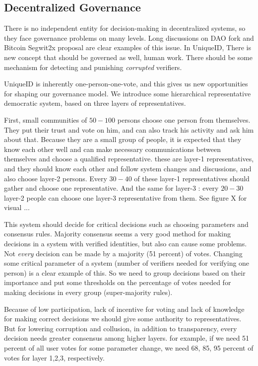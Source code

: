 \documentclass[conference]{IEEEtran}
\begin{document}
\subsection{Decentralized Governance}
There is no independent entity for decision-making in decentralized systems, so they face governance problems on many levels. Long discussions on  DAO fork and Bitcoin Segwit2x proposal are clear examples of this issue. In UniqueID, There is new concept that should be governed as well, human work. There should be some mechanism for detecting and punishing \textit{corrupted} verifiers.


UniqueID is inherently one-person-one-vote, and this gives us new opportunities for shaping our governance model. We introduce some hierarchical representative democratic system, based on three layers of representatives. 


First, small communities of $50-100$ persons choose one person from themselves. They put their trust and vote on him, and can also track his activity and ask him about that. Because they are a small group of people, it is expected that they know each other well and can make necessary communications between themselves and choose a qualified representative. these are layer-1 representatives, and they should know each other and follow system changes and discussions, and also choose layer-2 persons. Every $30-40$ of these layer-1 representatives should gather and choose one representative. And the same for layer-3 : every $20-30$ layer-2 people can choose one layer-3 representative from them. See figure X for visual ...


This system should decide for critical decisions such as choosing parameters and consensus rules. Majority consensus seems a very good method for making decisions in a system with verified identities, but also can cause some problems. Not \textit{every} decision can be made by a majority (51 percent) of votes. Changing some critical parameter of a system (number of verifiers needed for verifying one person) is a clear example of this. So we need to group decisions based on their importance and put some thresholds on the percentage of votes needed for making decisions in every group (super-majority rules).


Because of low participation, lack of incentive for voting and lack of knowledge for making correct decisions we should give some authority to representatives. But for lowering corruption and collusion, in addition to transparency, every decision needs greater consensus among higher layers. for example, if we need 51 percent of all user votes for some parameter change, we need 68, 85, 95 percent  of votes for layer 1,2,3, respectively.
\end{document}
